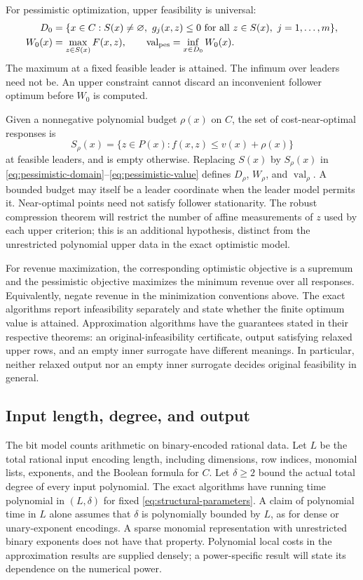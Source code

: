 For pessimistic optimization, upper feasibility is universal:
\begin{align}
 D_0&=\{x\in C:S(x)\ne\varnothing,\
             g_j(x,z)\le0\text{ for all }z\in S(x),\ j=1,\ldots,m\},
 \label{eq:pessimistic-domain}\\
 W_0(x)&=\max_{z\in S(x)}F(x,z),\qquad
 \operatorname{val}_{\rm pes}=\inf_{x\in D_0}W_0(x).
 \label{eq:pessimistic-value}
\end{align}
The maximum at a fixed feasible leader is attained. The infimum over
leaders need not be. An upper constraint cannot discard an inconvenient
follower optimum before $W_0$ is computed.

Given a nonnegative polynomial budget $\rho(x)$ on $C$, the set of
cost-near-optimal responses is
\begin{equation}\label{eq:nearoptimal-set}
 S_\rho(x)=\{z\in P(x):f(x,z)\le v(x)+\rho(x)\}
\end{equation}
at feasible leaders, and is empty otherwise. Replacing $S(x)$ by
$S_\rho(x)$ in \eqref{eq:pessimistic-domain}--\eqref{eq:pessimistic-value}
defines $D_\rho$, $W_\rho$, and $\operatorname{val}_\rho$.
A bounded budget may itself be a leader coordinate when the leader model
permits it. Near-optimal points need not satisfy follower stationarity.
The robust compression theorem will restrict the number of affine
measurements of $z$ used by each upper criterion; this is an additional
hypothesis, distinct from the unrestricted polynomial upper data in the
exact optimistic model.

For revenue maximization, the corresponding optimistic objective is a
supremum and the pessimistic objective maximizes the minimum revenue over
all responses. Equivalently, negate revenue in the minimization
conventions above. The exact algorithms report infeasibility separately
and state whether the finite optimum value is attained. Approximation
algorithms have the guarantees stated in their respective theorems:
an original-infeasibility certificate, output satisfying relaxed upper
rows, and an empty inner surrogate have different meanings. In particular,
neither relaxed output nor an empty inner surrogate decides original
feasibility in general.

\subsection{Input length, degree, and output}\label{subsec:encoding}

The bit model counts arithmetic on binary-encoded rational data. Let $L$
be the total rational input encoding length, including dimensions, row
indices, monomial lists, exponents, and the Boolean formula for $C$.
Let $\delta\ge2$ bound the actual total degree of every input polynomial.
The exact algorithms have running time polynomial in $(L,\delta)$ for
fixed \eqref{eq:structural-parameters}. A claim of polynomial time in $L$
alone assumes that $\delta$ is polynomially bounded by $L$, as for dense
or unary-exponent encodings. A sparse monomial representation with
unrestricted binary exponents does not have that property. Polynomial
local costs in the approximation results are supplied densely; a
power-specific result will state its dependence on the numerical power.

